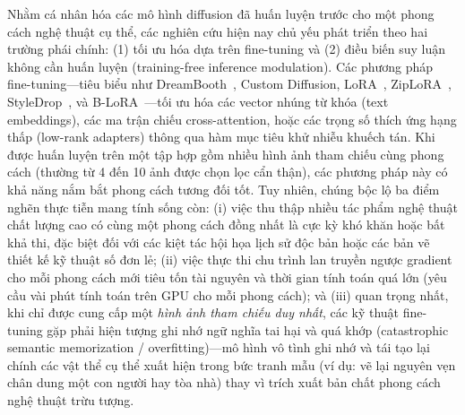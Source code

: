 \documentclass[runningheads]{llncs}
\begin{document}
Nhằm cá nhân hóa các mô hình diffusion đã huấn luyện trước cho một phong cách nghệ thuật cụ thể, các nghiên cứu hiện nay chủ yếu phát triển theo hai trường phái chính: (1) tối ưu hóa dựa trên fine-tuning và (2) điều biến suy luận không cần huấn luyện (training-free inference modulation). Các phương pháp fine-tuning---tiêu biểu như DreamBooth~\cite{dreambooth}, Custom Diffusion, LoRA~\cite{lora}, ZipLoRA~\cite{ziplora}, StyleDrop~\cite{styledrop}, và B-LoRA~\cite{b-lora}---tối ưu hóa các vector nhúng từ khóa (text embeddings), các ma trận chiếu cross-attention, hoặc các trọng số thích ứng hạng thấp (low-rank adapters) thông qua hàm mục tiêu khử nhiễu khuếch tán. Khi được huấn luyện trên một tập hợp gồm nhiều hình ảnh tham chiếu cùng phong cách (thường từ 4 đến 10 ảnh được chọn lọc cẩn thận), các phương pháp này có khả năng nắm bắt phong cách tương đối tốt. Tuy nhiên, chúng bộc lộ ba điểm nghẽn thực tiễn mang tính sống còn:
(i) việc thu thập nhiều tác phẩm nghệ thuật chất lượng cao có cùng một phong cách đồng nhất là cực kỳ khó khăn hoặc bất khả thi, đặc biệt đối với các kiệt tác hội họa lịch sử độc bản hoặc các bản vẽ thiết kế kỹ thuật số đơn lẻ;
(ii) việc thực thi chu trình lan truyền ngược gradient cho mỗi phong cách mới tiêu tốn tài nguyên và thời gian tính toán quá lớn (yêu cầu vài phút tính toán trên GPU cho mỗi phong cách); và
(iii) quan trọng nhất, khi chỉ được cung cấp một \textit{hình ảnh tham chiếu duy nhất}, các kỹ thuật fine-tuning gặp phải hiện tượng ghi nhớ ngữ nghĩa tai hại và quá khớp (catastrophic semantic memorization / overfitting)---mô hình vô tình ghi nhớ và tái tạo lại chính các vật thể cụ thể xuất hiện trong bức tranh mẫu (ví dụ: vẽ lại nguyên vẹn chân dung một con người hay tòa nhà) thay vì trích xuất bản chất phong cách nghệ thuật trừu tượng.
\end{document}
